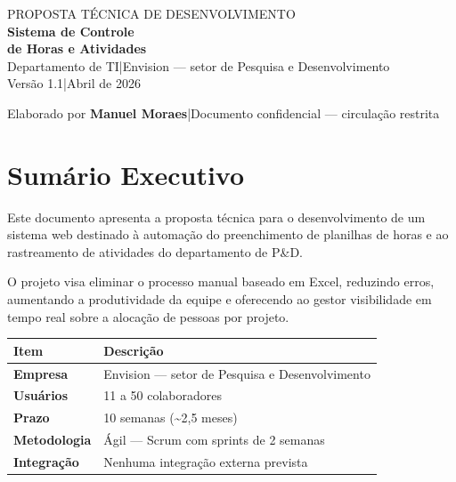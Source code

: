 \documentclass[12pt,a4paper]{article}
\begin{document}
\begin{titlepage}
  \pagecolor{azulprimario}
  \color{white}
  \centering
  \vspace*{3cm}

  {\fontsize{11}{13}\selectfont\uppercase{Proposta Técnica de Desenvolvimento}}\\[0.6em]
  {\fontsize{28}{32}\bfseries\selectfont Sistema de Controle\\[0.2em]de Horas e Atividades}\\[1.2em]
  \color{azulclaro}
  {\large Departamento de TI\enspace|\enspace Envision — setor de Pesquisa e Desenvolvimento}\\[0.4em]
  {\normalsize Versão 1.1\enspace|\enspace Abril de 2026}

  \vfill


  \vspace{1cm}
  \color{white!80!azulprimario}
  {\small Elaborado por \textbf{Manuel Moraes}\enspace|\enspace Documento confidencial — circulação restrita}
\end{titlepage}
\pagecolor{white}
\color{black}

\tableofcontents
\newpage

\section{Sumário Executivo}

Este documento apresenta a proposta técnica para o desenvolvimento de um sistema web
destinado à automação do preenchimento de planilhas de horas e ao rastreamento de atividades
do departamento de P\&D.

O projeto visa eliminar o processo manual baseado em Excel, reduzindo erros, aumentando a
produtividade da equipe e oferecendo ao gestor visibilidade em tempo real sobre a alocação de
pessoas por projeto.

\vspace{0.8em}
\begin{tabularx}{\linewidth}{>{\bfseries}lX}
  \toprule
  Item & Descrição \\
  \midrule
  Empresa      & Envision — setor de Pesquisa e Desenvolvimento  \\
  Usuários     & 11 a 50 colaboradores \\
  Prazo        & 10 semanas (\textasciitilde{}2,5 meses) \\
  Metodologia  & Ágil — Scrum com sprints de 2 semanas \\
  Integração   & Nenhuma integração externa prevista \\
  \bottomrule
\end{tabularx}
\end{document}

